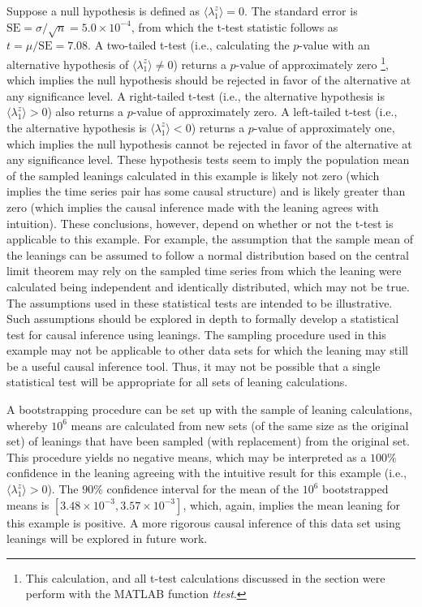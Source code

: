 \documentclass[twocolumn,aps,pre,groupedaddress]{revtex4-1}
\begin{document}
Suppose a null hypothesis is defined as $\langle\lambda_1^z\rangle = 0$.  The standard error is $\mathrm{SE}=\sigma/\sqrt{n}= 5.0\times 10^{-4}$, from which the t-test statistic follows \cite{Casella2002} as $t=\mu/\mathrm{SE}=7.08$.  A two-tailed t-test (i.e., calculating the $p$-value with an alternative hypothesis of $\langle\lambda_1^z\rangle \neq 0$) returns a $p$-value of approximately zero \footnote{This calculation, and all t-test calculations discussed in the section were perform with the {\sc MATLAB} function {\em ttest}.}, which implies the null hypothesis should be rejected in favor of the alternative at any significance level.  A right-tailed t-test (i.e., the alternative hypothesis is $\langle\lambda_1^z\rangle > 0$) also returns a $p$-value of approximately zero.  A left-tailed t-test (i.e., the alternative hypothesis is $\langle\lambda_1^z\rangle < 0$) returns a $p$-value of approximately one, which implies the null hypothesis cannot be rejected in favor of the alternative at any significance level.  These hypothesis tests seem to imply the population mean of the sampled leanings calculated in this example is likely not zero (which implies the time series pair has some causal structure) and is likely greater than zero (which implies the causal inference made with the leaning agrees with intuition).  These conclusions, however, depend on whether or not the t-test is applicable to this example.  For example, the assumption that the sample mean of the leanings can be assumed to follow a normal distribution based on the central limit theorem \cite{Casella2002} may rely on the sampled time series from which the leaning were calculated being independent and identically distributed, which may not be true.  The assumptions used in these statistical tests are intended to be illustrative.  Such assumptions should be explored in depth to formally develop a statistical test for causal inference using leanings.  The sampling procedure used in this example may not be applicable to other data sets for which the leaning may still be a useful causal inference tool.  Thus, it may not be possible that a single statistical test will be appropriate for all sets of leaning calculations.  

A bootstrapping \cite{Efron1994} procedure can be set up with the sample of leaning calculations, whereby $10^6$ means are calculated from new sets (of the same size as the original set) of leanings that have been sampled (with replacement) from the original set.  This procedure yields no negative means, which may be interpreted as a $100\%$ confidence in the leaning agreeing with the intuitive result for this example (i.e., $\langle\lambda_1^z\rangle > 0$).  The $90\%$ confidence interval for the mean of the $10^6$ bootstrapped means is $[3.48\times 10^{-3},3.57\times 10^{-3}]$, which, again, implies the mean leaning for this example is positive.  A more rigorous causal inference of this data set using leanings will be explored in future work.  
\end{document}
